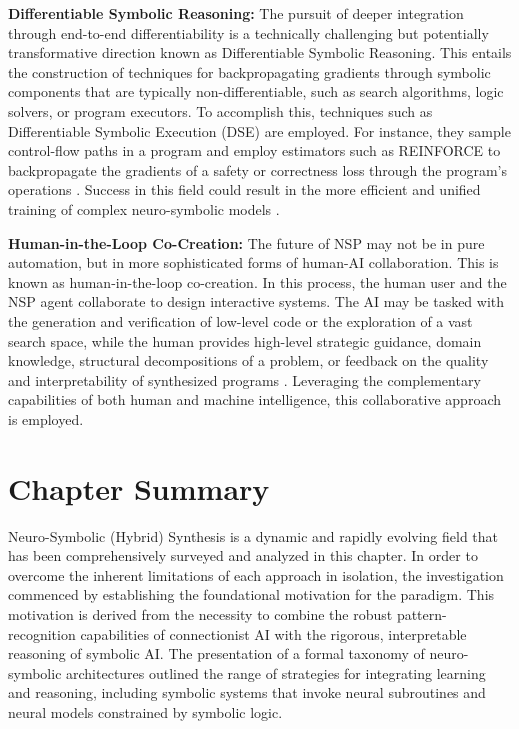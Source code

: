 \documentclass[12pt, a4paper]{report}
\begin{document}
\textbf{Differentiable Symbolic Reasoning:} The pursuit of deeper integration through end-to-end differentiability is a technically challenging but potentially transformative direction known as Differentiable Symbolic Reasoning. This entails the construction of techniques for backpropagating gradients through symbolic components that are typically non-differentiable, such as search algorithms, logic solvers, or program executors. To accomplish this, techniques such as Differentiable Symbolic Execution (DSE) are employed. For instance, they sample control-flow paths in a program and employ estimators such as REINFORCE to backpropagate the gradients of a safety or correctness loss through the program's operations \citep{yang2022differentiable}. Success in this field could result in the more efficient and unified training of complex neuro-symbolic models \citep{yang2022differentiable}.

\textbf{Human-in-the-Loop Co-Creation:} The future of NSP may not be in pure automation, but in more sophisticated forms of human-AI collaboration. This is known as human-in-the-loop co-creation. In this process, the human user and the NSP agent collaborate to design interactive systems. The AI may be tasked with the generation and verification of low-level code or the exploration of a vast search space, while the human provides high-level strategic guidance, domain knowledge, structural decompositions of a problem, or feedback on the quality and interpretability of synthesized programs \citep{anderson2020human}.
Leveraging the complementary capabilities of both human and machine intelligence, this collaborative approach is employed.

\section{Chapter Summary}
Neuro-Symbolic (Hybrid) Synthesis is a dynamic and rapidly evolving field that has been comprehensively surveyed and analyzed in this chapter. In order to overcome the inherent limitations of each approach in isolation, the investigation commenced by establishing the foundational motivation for the paradigm. This motivation is derived from the necessity to combine the robust pattern-recognition capabilities of connectionist AI with the rigorous, interpretable reasoning of symbolic AI. The presentation of a formal taxonomy of neuro-symbolic architectures outlined the range of strategies for integrating learning and reasoning, including symbolic systems that invoke neural subroutines and neural models constrained by symbolic logic.
\end{document}
